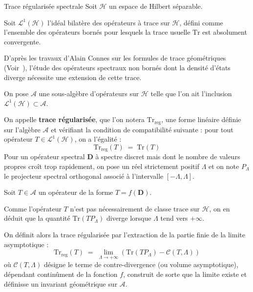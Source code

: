\documentclass[Riemann_Hypothesis.tex]{subfiles}
\begin{document}
\begin{DefNef}[label=df:TraceRegularisee_fr]{Trace régularisée spectrale}
    Soit $\mathcal{H}$ un espace de Hilbert séparable. \par
    Soit $\mathcal{L}^1(\mathcal{H})$ l'idéal bilatère des opérateurs à trace sur $\mathcal{H}$, défini comme l'ensemble des opérateurs bornés pour lesquels la trace usuelle $\mathrm{Tr}$ est absolument convergente. \par
    D'après les travaux d'Alain Connes sur les formules de trace géométriques 
    (Voir~\cite{connes1999_trace}), 
    l'étude des opérateurs spectraux non bornés dont la densité d'états diverge nécessite une extension de cette trace. \par
    On pose $\mathcal{A}$ une sous-algèbre d'opérateurs sur $\mathcal{H}$ telle que l'on ait l'inclusion $\mathcal{L}^1(\mathcal{H}) \subset \mathcal{A}$. \par
    On appelle \textbf{trace régularisée}, que l'on notera $\mathrm{Tr}_{\mathrm{reg}}$, une forme linéaire définie sur l'algèbre $\mathcal{A}$ et vérifiant la condition de compatibilité suivante : pour tout opérateur $T \in \mathcal{L}^1(\mathcal{H})$, on a l'égalité :
    \begin{equation*}
        \mathrm{Tr}_{\mathrm{reg}}(T) \;=\; \mathrm{Tr}(T)
    \end{equation*}
    Pour un opérateur spectral $\mathbf{D}$ à spectre discret mais dont le nombre de valeurs propres croît trop rapidement, on pose un réel strictement positif $\Lambda$ et on note $P_\Lambda$ le projecteur spectral orthogonal associé à l'intervalle $[-\Lambda, \Lambda]$. \par
    Soit $T \in \mathcal{A}$ un opérateur de la forme $T = f(\mathbf{D})$. \par
    Comme l'opérateur $T$ n'est pas nécessairement de classe trace sur $\mathcal{H}$, on en déduit que la quantité $\mathrm{Tr}(T P_\Lambda)$ diverge lorsque $\Lambda$ tend vers $+\infty$. \par
    On définit alors la trace régularisée par l'extraction de la partie finie de la limite asymptotique :
    \begin{equation*}
        \mathrm{Tr}_{\mathrm{reg}}(T) \;=\; \lim_{\Lambda \to +\infty} \left( \mathrm{Tr}(T P_\Lambda) - \mathcal{C}(T, \Lambda) \right)
    \end{equation*}
    où $\mathcal{C}(T, \Lambda)$ désigne le terme de contre-divergence (ou volume asymptotique), dépendant continûment de la fonction $f$, construit de sorte que la limite existe et définisse un invariant géométrique sur $\mathcal{A}$.
\end{DefNef}
\end{document}
